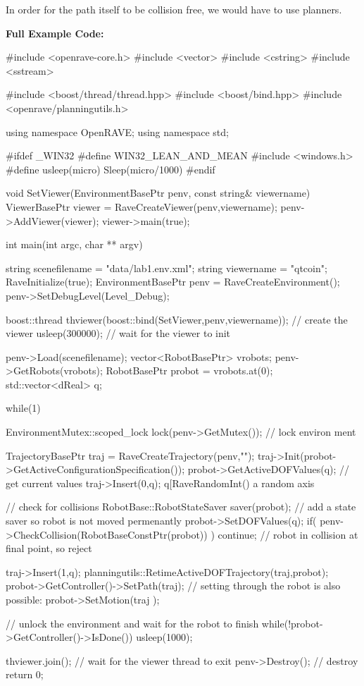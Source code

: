 In order for the path itself to be collision free, we would have to use planners.

{\bfseries Full Example Code:}


\begin{DoxyCodeInclude}

#include <openrave-core.h>
#include <vector>
#include <cstring>
#include <sstream>

#include <boost/thread/thread.hpp>
#include <boost/bind.hpp>
#include <openrave/planningutils.h>

using namespace OpenRAVE;
using namespace std;

#ifdef _WIN32
#define WIN32_LEAN_AND_MEAN
#include <windows.h>
#define usleep(micro) Sleep(micro/1000)
#endif

void SetViewer(EnvironmentBasePtr penv, const string& viewername)
{
    ViewerBasePtr viewer = RaveCreateViewer(penv,viewername);
    penv->AddViewer(viewer);
    viewer->main(true);
}

int main(int argc, char ** argv)
{
    string scenefilename = "data/lab1.env.xml";
    string viewername = "qtcoin";
    RaveInitialize(true);
    EnvironmentBasePtr penv = RaveCreateEnvironment();
    penv->SetDebugLevel(Level_Debug);

    boost::thread thviewer(boost::bind(SetViewer,penv,viewername)); // create the
       viewer
    usleep(300000); // wait for the viewer to init

    penv->Load(scenefilename);
    vector<RobotBasePtr> vrobots;
    penv->GetRobots(vrobots);
    RobotBasePtr probot = vrobots.at(0);
    std::vector<dReal> q;

    while(1) {
        {
            EnvironmentMutex::scoped_lock lock(penv->GetMutex()); // lock environ
      ment

            TrajectoryBasePtr traj = RaveCreateTrajectory(penv,"");
            traj->Init(probot->GetActiveConfigurationSpecification());
            probot->GetActiveDOFValues(q); // get current values
            traj->Insert(0,q);
            q[RaveRandomInt()%
       a random axis

            // check for collisions
            {
                RobotBase::RobotStateSaver saver(probot); // add a state saver so
       robot is not moved permenantly
                probot->SetDOFValues(q);
                if( penv->CheckCollision(RobotBaseConstPtr(probot)) ) {
                    continue; // robot in collision at final point, so reject
                }
            }

            traj->Insert(1,q);
            planningutils::RetimeActiveDOFTrajectory(traj,probot);
            probot->GetController()->SetPath(traj);
            // setting through the robot is also possible: probot->SetMotion(traj
      );
        }
        // unlock the environment and wait for the robot to finish
        while(!probot->GetController()->IsDone()) {
            usleep(1000);
        }
    }

    thviewer.join(); // wait for the viewer thread to exit
    penv->Destroy(); // destroy
    return 0;
}
\end{DoxyCodeInclude}
 